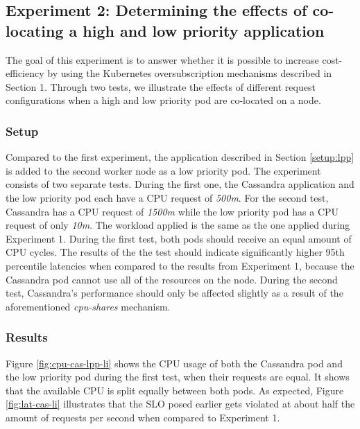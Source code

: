 \subsection{Experiment 2: Determining the effects of co-locating a high and low priority application}
The goal of this experiment is to answer whether it is possible to increase cost-efficiency by using the Kubernetes oversubscription mechanisms described in Section 1. Through two tests, we illustrate the effects of different request configurations when a high and low priority pod are co-located on a node.

\subsubsection{Setup}
Compared to the first experiment, the application described in Section \ref{setup:lpp} is added to the second worker node as a low priority pod. The experiment consists of two separate tests. During the first one, the Cassandra application and the low priority pod each have a CPU request of \textit{500m}. For the second test, Cassandra has a CPU request of \textit{1500m} while the low priority pod has a CPU request of only \textit{10m}. The workload applied is the same as the one applied during Experiment 1. During the first test, both pods should receive an equal amount of CPU cycles. The results of the the test should indicate significantly higher 95th percentile latencies when compared to the results from Experiment 1, because the Cassandra pod cannot use all of the resources on the node. During the second test, Cassandra's performance should only be affected slightly as a result of the aforementioned \textit{cpu-shares} mechanism.

\subsubsection{Results}
Figure \ref{fig:cpu-cas-lpp-li} shows the CPU usage of both the Cassandra pod and the low priority pod during the first test, when their requests are equal. It shows that the available CPU is split equally between both pods. As expected, Figure \ref{fig:lat-cas-li} illustrates that the SLO posed earlier gets violated at about half the amount of requests per second when compared to Experiment 1.

